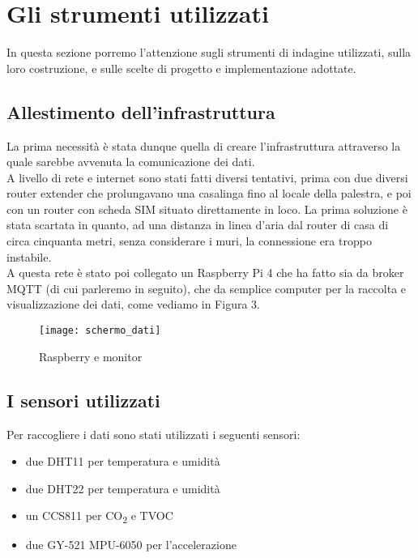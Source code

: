 \documentclass[fleqn,10pt]{SelfArx} %
\begin{document}

\section{Gli strumenti utilizzati}

In questa sezione porremo l'attenzione sugli strumenti di indagine utilizzati, sulla loro costruzione, 
e sulle scelte di progetto e implementazione adottate.

\subsection{Allestimento dell'infrastruttura}

La prima necessità è stata dunque quella di creare l'infrastruttura attraverso la quale sarebbe avvenuta la 
comunicazione dei dati.\\
A livello di rete e internet sono stati fatti diversi tentativi, prima con due diversi router extender che 
prolungavano una casalinga fino al locale della palestra, e poi con un router con scheda SIM 
situato direttamente in loco. La prima soluzione è stata scartata in quanto, ad una distanza in linea d'aria 
dal router di casa di circa cinquanta metri, senza considerare i muri, la connessione era troppo instabile.\\

A questa rete è stato poi collegato un Raspberry Pi 4 che ha fatto sia da broker MQTT (di cui parleremo in seguito), 
che da semplice computer per la raccolta e visualizzazione dei dati, come vediamo in Figura 3.

\begin{figure}[htb!]\centering
	\texttt{[image: schermo\_dati]}
	\caption{Raspberry e monitor}
	\label{fig:schermo}
\end{figure}

\subsection{I sensori utilizzati}

Per raccogliere i dati sono stati utilizzati i seguenti sensori:

\begin{itemize}[noitemsep] %
	\item due DHT11 per temperatura e umidità
	\item due DHT22 per temperatura e umidità
	\item un CCS811 per CO\textsubscript{2} e TVOC
	\item due GY-521 MPU-6050 per l'accelerazione
\end{itemize}
\end{document}
